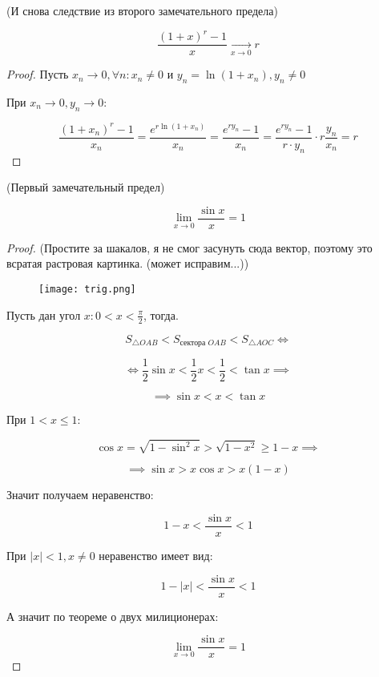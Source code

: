 \begin{theorem} (И снова следствие из второго замечательного предела)
    
    \[\frac{(1+x)^r-1}{x}  \underset{x \to 0}{\to} r\]
\end{theorem}

\begin{proof}
    Пусть $x_n \to 0, \forall n: x_n \neq 0$ и $y_n = \ln(1+x_n), y_n \neq 0$

    При $x_n \to 0, y_n \to 0$:

    \[\frac{(1+x_n)^r-1}{x_n} = \frac{e^{r\ln(1+x_n)}}{x_n} = \frac{e^{ry_n}-1}{x_n} = \frac{e^{ry_n}-1}{r \cdot y_n} \cdot r\frac{y_n}{x_n} = r\]
\end{proof}

\begin{theorem} (Первый замечательный предел)
    
    \[\lim\limits_{x \to 0} \frac{\sin x}{x} = 1\]

\end{theorem}

\begin{proof} (Простите за шакалов, я не смог засунуть сюда вектор, поэтому это всратая растровая картинка. (может исправим...))
    
    \begin{figure}[H]
        \centering
        \texttt{[image: trig.png]}
        
        
        \label{fig:1}
    \end{figure}

    Пусть дан угол $x: 0 < x < \frac{\pi}{2}$, тогда.

    $$S_{\triangle OAB} < S_{\text{сектора }OAB} < S_{\triangle AOC} \Leftrightarrow$$

    $$\Leftrightarrow \frac{1}{2} \sin x < \frac{1}{2}x < \frac{1}{2} < \tan x \implies$$

    $$\implies \sin x < x < \tan x$$

    При $1 < x \leq 1$:

    $$\cos x = \sqrt{1 - \sin^2 x} > \sqrt{1 - x^2} \geq 1 - x \implies$$

    $$\implies \sin x > x\cos x > x(1 - x)$$

    Значит получаем неравенство:

    $$1 - x < \frac{\sin x}{x} < 1$$

    При $|x| < 1, x \neq 0$ неравенство имеет вид:

    $$1 - |x| < \frac{\sin x}{x} < 1$$

    А значит по теореме о двух милиционерах:

    \[\lim\limits_{x \to 0} \frac{\sin x}{x} = 1\]
\end{proof}